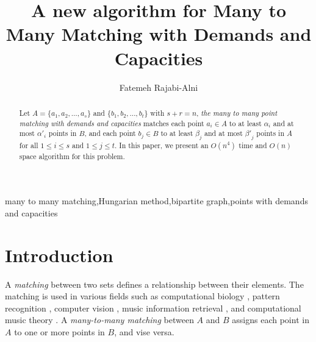 \documentclass[preprint,12pt]{elsarticle}
\begin{document}
\pagestyle{empty}
\begin{frontmatter}





\title{A new algorithm for Many to Many Matching with Demands and Capacities}



\author[la1]{Fatemeh Rajabi-Alni}



 \address[la1]{Department of Computer Engineering, Islamic Azad University,\\North Tehran Branch, Tehran, Iran.}




\begin{abstract}
Let $A=\{a_1,a_2,\dots,a_s\}$ and $\{b_1,b_2,\dots,b_t\}$ with $s+r=n$, \textit {the many to many point matching with demands and capacities} matches each point $a_i \in A$ to at least $\alpha_i$ and at most ${\alpha '}_i$ points in $B$, and each point $b_j \in B$ to at least $\beta_j$ and at most ${\beta '}_j$ points in $A$ for all $1 \leq i \leq s$ and $1 \leq j \leq t$. In this paper, we present an $O(n^4)$ time and $O(n)$ space algorithm for this problem.
\end{abstract}

\begin{keyword}


many to many matching\sep Hungarian method\sep bipartite graph\sep points with demands and capacities 


\end{keyword}

\end{frontmatter}






\section{Introduction}


A \textit {matching} between two sets defines a relationship between their elements. The matching is used in various fields such as computational biology \cite{1}, pattern recognition \cite{2}, computer vision \cite{3}, music information retrieval \cite{4}, and computational music theory \cite{5}. 
A \textit {many-to-many matching} between $A$ and $B$ assigns each point in $A$ to one or more points in $B$, and vise versa.
\end{document}
